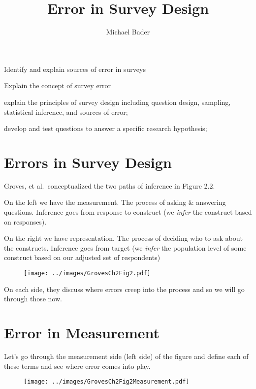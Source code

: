 \documentclass[11pt]{lecturenotes}
\title{Error in Survey Design}
\author{Michael Bader}
\begin{document}
\maketitle

\begin{objectives}{
\item Identify and explain sources of error in surveys 
\item Explain the concept of survey error}{
\item explain the principles of survey design including question design, sampling, statistical inference, and sources of error;
\item develop and test questions to answer a specific research hypothesis; 
}
\end{objectives}

\section[5]{Errors in Survey Design}
\slide
Groves, et al.\ conceptualized the two paths of inference in Figure 2.2. 

On the left we have the measurement. The process of asking \& answering questions. Inference goes from response to construct (we \emph{infer} the construct based on responses). 

On the right we have representation. The process of deciding who to ask about the constructs. Inference goes from target (we \emph{infer} the population level of some construct based on our adjusted set of respondents)

\begin{figure}[h!]
\begin{center}
\texttt{[image: ../images/GrovesCh2Fig2.pdf]}
\end{center}
\end{figure}

On each side, they discuss where errors creep into the process and so we will go through those now. 

\clearpage

\section{Error in Measurement}
\slide
Let's go through the measurement side (left side) of the figure and define each of these terms and see where error comes into play. 

\begin{figure}[h!]
\begin{center}
\texttt{[image: ../images/GrovesCh2Fig2Measurement.pdf]}
\end{center}
\end{figure}
\end{document}
